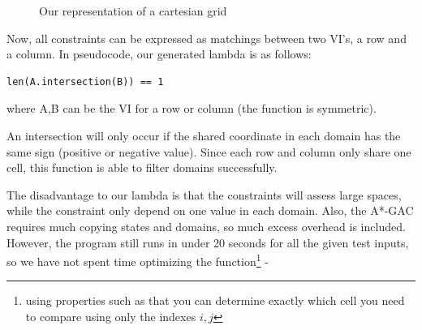 \documentclass[journal]{IEEEtran}
\begin{document}
\begin{figure}[Hb]
\centering
    \caption{Our representation of a cartesian grid}
\label{fig:grid}
\end{figure}

Now, all constraints can be expressed as matchings between two VI's,
a row and a column. In pseudocode, our generated lambda is as follows:
\begin{verbatim}
len(A.intersection(B)) == 1
\end{verbatim}

where A,B can be the VI for a row or column (the function is symmetric).

An intersection will only occur if the shared coordinate in each domain has the same
sign (positive or negative value). Since each row and column only share one cell,
this function is able to filter domains successfully.

The disadvantage to our lambda is that the constraints will assess large spaces,
while the constraint only depend on one value in each domain. Also,
the A*-GAC requires much copying states and domains, so much excess overhead
is included. However, the program still runs in under 20 seconds for all 
the given test inputs, so we have not spent time optimizing the function\footnote{
    using properties such as that you can determine exactly which cell you need
to compare using only the indexes $i,j$}
-

%
\end{document}
